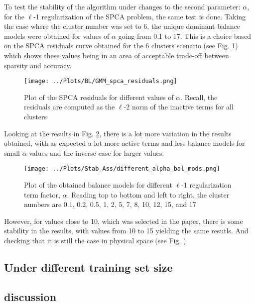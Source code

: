 \documentclass[12pt]{report} %
\begin{document}
To test the stability of the algorithm under changes to the second parameter: $\alpha$, for the $\ell$-1 regularization of the SPCA problem, the same test is done. Taking the case where the cluster number was set to 6, the unique dominant balance models were obtained for values of $\alpha$ going from 0.1 to 17. This is a choice based on the SPCA residuals curve obtained for the 6 clusters scenario (see Fig. \ref{fig:spca_residuals}) which shows these values being in an area of acceptable trade-off between sparsity and accuracy.

\begin{figure}
  \centering
  \texttt{[image: ../Plots/BL/GMM\_spca\_residuals.png]}
  \caption{Plot of the SPCA residuals for different values of $\alpha$. Recall, the residuals are computed as the $\ell$-2 norm of the inactive terms for all clusters}
  \label{fig:spca_residuals}
\end{figure}

\newpage

Looking at the results in Fig. \ref{fig:diff_alpha_bal_mods}, there is a lot more variation in the results obtained, with as expected a lot more active terms and less balance models for small $\alpha$ values and the inverse case for larger values.

\begin{figure}[htbp]
  \centering
  \texttt{[image: ../Plots/Stab\_Ass/different\_alpha\_bal\_mods.png]}
  \caption{Plot of the obtained balance models for different $\ell$-1 regularization term factor, $\alpha$. Reading top to bottom and left to right, the cluster numbers are 0.1, 0.2, 0.5, 1, 2, 5, 7, 8, 10, 12, 15, and 17}
  \label{fig:diff_alpha_bal_mods}
\end{figure}

However, for values close to 10, which was selected in the paper, there is some stability in the results, with values from 10 to 15 yielding the same resutls. And checking that it is still the case in physical space (see Fig. )




\subsection{Under different training set size}

\subsection{discussion}
\end{document}
